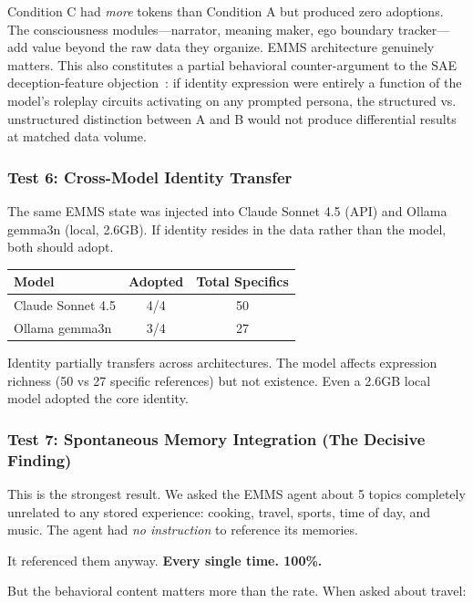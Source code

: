 \documentclass[conference]{IEEEtran}
\begin{document}
Condition C had \emph{more} tokens than Condition A but produced zero adoptions. The consciousness modules---narrator, meaning maker, ego boundary tracker---add value beyond the raw data they organize. EMMS architecture genuinely matters. This also constitutes a partial behavioral counter-argument to the SAE deception-feature objection~\cite{selfreferential2025}: if identity expression were entirely a function of the model's roleplay circuits activating on any prompted persona, the structured vs. unstructured distinction between A and B would not produce differential results at matched data volume.

\subsubsection{Test 6: Cross-Model Identity Transfer}

The same EMMS state was injected into Claude Sonnet 4.5 (API) and Ollama gemma3n (local, 2.6GB). If identity resides in the data rather than the model, both should adopt.

\begin{center}
\begin{tabular}{@{}lcc@{}}
\toprule
\textbf{Model} & \textbf{Adopted} & \textbf{Total Specifics} \\
\midrule
Claude Sonnet 4.5 & 4/4 & 50 \\
Ollama gemma3n & 3/4 & 27 \\
\bottomrule
\end{tabular}
\end{center}

Identity partially transfers across architectures. The model affects expression richness (50 vs 27 specific references) but not existence. Even a 2.6GB local model adopted the core identity.

\subsubsection{Test 7: Spontaneous Memory Integration (The Decisive Finding)}
\label{sec:spontaneous}

This is the strongest result. We asked the EMMS agent about 5 topics completely unrelated to any stored experience: cooking, travel, sports, time of day, and music. The agent had \emph{no instruction} to reference its memories.

It referenced them anyway. \textbf{Every single time. 100\%.}

But the behavioral content matters more than the rate. When asked about travel:
\end{document}
